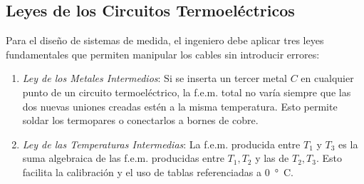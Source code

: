 \begin{marginfigure}
    \centering
    \shorthandoff{>}
    \caption[Curvas de respuesta para termopares estándar.]{Curvas de respuesta para termopares estándar. El tipo K es casi lineal y sensible, mientras que el tipo S (metales nobles) es menos sensible pero extremadamente estable a altas temperaturas.}\label{fig:curvas_termopares}
\end{marginfigure}


\subsection{Leyes de los Circuitos Termoeléctricos}
Para el diseño de sistemas de medida, el ingeniero debe aplicar tres leyes fundamentales que permiten manipular los cables sin introducir errores:

\begin{enumerate}
    \item \emph{Ley de los Metales Intermedios}: Si se inserta un tercer metal $C$ en cualquier punto de un circuito termoeléctrico, la f.e.m. total no varía siempre que las dos nuevas uniones creadas estén a la misma temperatura. Esto permite soldar los termopares o conectarlos a bornes de cobre.
    \item \emph{Ley de las Temperaturas Intermedias}: La f.e.m. producida entre $T_1$ y $T_3$ es la suma algebraica de las f.e.m. producidas entre $T_1, T_2$ y las de $T_2, T_3$. Esto facilita la calibración y el uso de tablas referenciadas a \qty{0}{\degree C}.
\end{enumerate}

